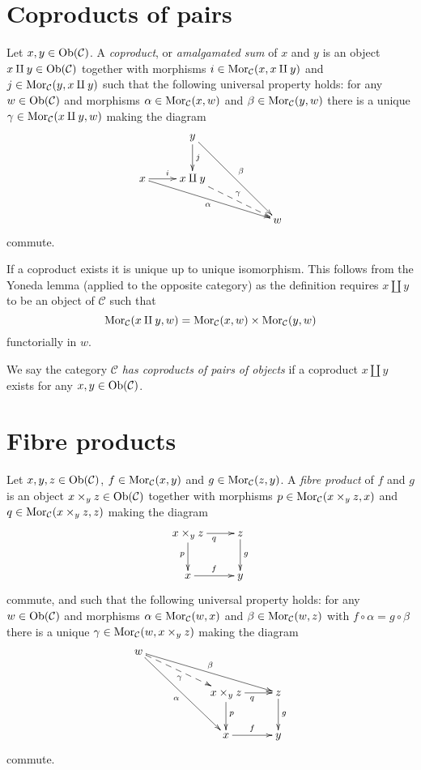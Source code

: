 \section{Coproducts of pairs}
\label{section-coproducts-pairs}

\begin{definition}
\label{definition-coproducts}
Let $x, y \in \mathop{\mathrm{Ob}}\nolimits(\mathcal{C})$.
A {\it coproduct}, or {\it amalgamated sum} of $x$ and $y$ is
an object $x \amalg y \in \mathop{\mathrm{Ob}}\nolimits(\mathcal{C})$
together with morphisms
$i \in \mathop{\mathrm{Mor}}\nolimits_{\mathcal C}(x, x \amalg y)$ and
$j \in \mathop{\mathrm{Mor}}\nolimits_{\mathcal C}(y, x \amalg y)$ such
that the following universal property holds: for
any $w \in \mathop{\mathrm{Ob}}\nolimits(\mathcal{C})$ and morphisms
$\alpha \in \mathop{\mathrm{Mor}}\nolimits_{\mathcal C}(x, w)$ and
$\beta \in \mathop{\mathrm{Mor}}\nolimits_\mathcal{C}(y, w)$
there is a unique
$\gamma \in \mathop{\mathrm{Mor}}\nolimits_{\mathcal C}(x \amalg y, w)$ making
the diagram
$$
\xymatrix{
& y \ar[d]^j \ar[rrdd]^\beta \\
x \ar[r]^i \ar[rrrd]_\alpha & x \amalg y \ar@{-->}[rrd]^\gamma \\
& & & w
}
$$
commute.
\end{definition}

\noindent
If a coproduct exists it is unique up to unique
isomorphism. This follows from the Yoneda lemma (applied to the
opposite category) as
the definition requires $x \amalg y$ to be an object
of $\mathcal{C}$ such that
$$
\mathop{\mathrm{Mor}}\nolimits_\mathcal{C}(x \amalg y, w) =
\mathop{\mathrm{Mor}}\nolimits_\mathcal{C}(x, w) \times \mathop{\mathrm{Mor}}\nolimits_\mathcal{C}(y, w)
$$
functorially in $w$.

\begin{definition}
\label{definition-has-coproducts-of-pairs}
We say the category $\mathcal{C}$ {\it has coproducts of pairs
of objects} if a coproduct $x \amalg y$
exists for any $x, y \in \mathop{\mathrm{Ob}}\nolimits(\mathcal{C})$.
\end{definition}
\section{Fibre products}
\label{section-fibre-products}

\begin{definition}
\label{definition-fibre-products}
Let $x, y, z\in \mathop{\mathrm{Ob}}\nolimits(\mathcal{C})$,
$f\in \mathop{\mathrm{Mor}}\nolimits_\mathcal{C}(x, y)$
and $g\in \mathop{\mathrm{Mor}}\nolimits_{\mathcal C}(z, y)$.
A {\it fibre product} of $f$ and $g$ is
an object $x \times_y z\in \mathop{\mathrm{Ob}}\nolimits(\mathcal{C})$
together with morphisms
$p \in \mathop{\mathrm{Mor}}\nolimits_{\mathcal C}(x \times_y z, x)$ and
$q \in \mathop{\mathrm{Mor}}\nolimits_{\mathcal C}(x \times_y z, z)$ making the diagram
$$
\xymatrix{
x \times_y z \ar[r]_q \ar[d]_p & z \ar[d]^g \\
x \ar[r]^f & y
}
$$
commute, and such that the following universal property holds: for
any $w\in \mathop{\mathrm{Ob}}\nolimits(\mathcal{C})$ and morphisms
$\alpha \in \mathop{\mathrm{Mor}}\nolimits_{\mathcal C}(w, x)$ and
$\beta \in \mathop{\mathrm{Mor}}\nolimits_\mathcal{C}(w, z)$ with
$f \circ \alpha = g \circ \beta$
there is a unique
$\gamma \in \mathop{\mathrm{Mor}}\nolimits_{\mathcal C}(w, x \times_y z)$ making
the diagram
$$
\xymatrix{
w \ar[rrrd]^\beta \ar@{-->}[rrd]_\gamma \ar[rrdd]_\alpha & & \\
& & x \times_y z \ar[d]^p \ar[r]_q & z \ar[d]^g \\
& & x \ar[r]^f & y
}
$$
commute.
\end{definition}

